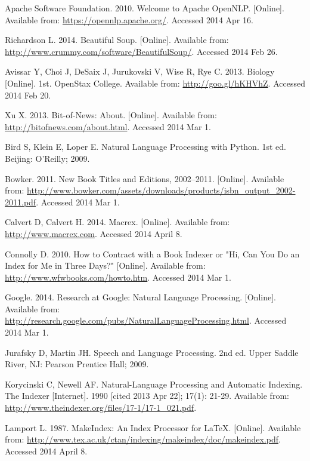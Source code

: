 \begin{thebibliography}{99}

Apache Software Foundation. 2010. Welcome to Apache OpenNLP. [Online]. Available from: \url{https://opennlp.apache.org/}. Accessed 2014 Apr 16.

Richardson L. 2014. Beautiful Soup. [Online]. Available from: \url{http://www.crummy.com/software/BeautifulSoup/}. Accessed 2014 Feb 26.

Avissar Y, Choi J, DeSaix J, Jurukovski V, Wise R, Rye C. 2013. Biology [Online]. 1st. OpenStax College. Available from: \url{http://goo.gl/hKHVhZ}. Accessed 2014 Feb 20.

Xu X. 2013. Bit-of-News: About. [Online]. Available from: \url{http://bitofnews.com/about.html}. Accessed 2014 Mar 1.

Bird S, Klein E, Loper E. Natural Language Processing with Python. 1st ed. Beijing: O'Reilly; 2009.

Bowker. 2011. New Book Titles and Editions, 2002--2011. [Online]. Available from: \url{http://www.bowker.com/assets/downloads/products/isbn_output_2002-2011.pdf}. Accessed 2014 Mar 1.

Calvert D, Calvert H. 2014. Macrex. [Online]. Available from: \url{http://www.macrex.com}. Accessed 2014 April 8.

Connolly D. 2010. How to Contract with a Book Indexer or "Hi, Can You Do an Index for Me in Three Days?" [Online]. Available from: \url{http://www.wfwbooks.com/howto.htm}. Accessed 2014 Mar 1.

Google. 2014. Research at Google: Natural Language Processing. [Online]. Available from: \url{http://research.google.com/pubs/NaturalLanguageProcessing.html}. Accessed 2014 Mar 1.

Jurafsky D, Martin JH. Speech and Language Processing. 2nd ed. Upper Saddle River, NJ: Pearson Prentice Hall; 2009.

Korycinski C, Newell AF. Natural-Language Processing and Automatic Indexing. The Indexer [Internet]. 1990 [cited 2013 Apr 22]; 17(1): 21-29. Available from: \url{http://www.theindexer.org/files/17-1/17-1_021.pdf}.

Lamport L. 1987. MakeIndex: An Index Processor for \LaTeX. [Online]. Available from: \url{http://www.tex.ac.uk/ctan/indexing/makeindex/doc/makeindex.pdf}. Accessed 2014 April 8.


\end{thebibliography}

